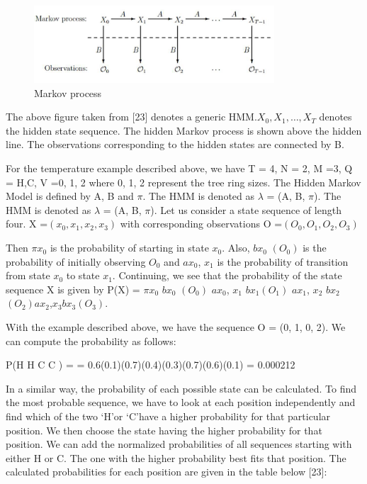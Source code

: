 \begin{figure}[htb]
\centering
\includegraphics[width=0.8\textwidth]{images/markov.jpg}
\caption{Markov process} 
\label{fig:Markov process}
\end{figure}
\pagebreak
The above figure taken from [23] denotes a generic HMM.$ X_0 , X_1 , \dots, X_T $ denotes the hidden state sequence. The hidden Markov process is shown above the hidden line. The observations corresponding to the hidden states are connected by B. 

For the temperature example described above, we have T = 4, N = 2, M =3, Q = {H,C}, V ={0, 1, 2} where 0, 1, 2 represent the tree ring sizes. The Hidden Markov Model is defined by A, B and $\pi$. The HMM is denoted as $\lambda$ = (A, B, $\pi$). The HMM is denoted as $\lambda$ = (A, B, $\pi$).
Let us consider a state sequence of length four.
X =$(x_0, x_1, x_2, x_3)$ with corresponding observations O =$(O_0, O_1, O_2, O_3)$

Then $\pi x_0$ is the probability of starting in state $x_0$. Also, $b x_0$ $(O_0)$ is the probability of initially observing $O_0$ and $a x_0$, $x_1$ is the probability of transition from state $x_0$ to state $x_1$. Continuing, we see that the probability of the state sequence X is given by 
P(X) = $\pi x_0$ $b x_0$ $(O_0)$ $a x_0$, $ x_1$ $b x_1 (O_1)$ $a x_1$, $x_2$ $b x_2$ $(O_2) a x_2$,$x_3 b x_3(O_3)$.

With the example described above, we have the sequence O = (0, 1, 0, 2). We can compute the probability as follows:

P(H H C C ) = = 0.6(0.1)(0.7)(0.4)(0.3)(0.7)(0.6)(0.1) = 0.000212

In a similar way, the probability of each possible state can be calculated. To find the most probable sequence, we have to look at each position independently and find which of the two \lq H\rq or \lq C\rq have a higher probability for that particular position. We then choose the state having the higher probability for that position. We can add the normalized probabilities of all sequences starting with either H or C. The one with the higher probability best fits that position. The calculated probabilities for each position are given in the table below [23]:

